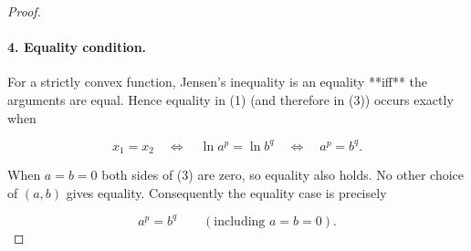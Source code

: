 \begin{proof}
\paragraph{4. Equality condition.}
For a strictly convex function, Jensen’s inequality is an equality **iff** the
arguments are equal. Hence equality in (1) (and therefore in (3)) occurs exactly when  

\[
x_{1}=x_{2}\quad\Longleftrightarrow\quad
\ln a^{p}= \ln b^{q}\quad\Longleftrightarrow\quad
a^{p}=b^{q}.
\]

When \(a=b=0\) both sides of (3) are zero, so equality also holds. No other
choice of \((a,b)\) gives equality. Consequently the equality case is precisely  

\[
a^{p}=b^{q}\qquad(\text{including }a=b=0).
\]

\end{proof}